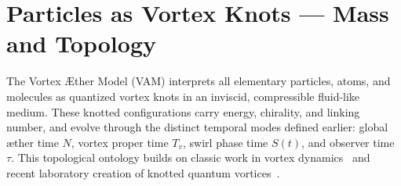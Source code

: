 \documentclass[preprint]{revtex4-2}
\begin{document}
\section{Particles as Vortex Knots — Mass and Topology}
    The Vortex \AE{}ther Model (VAM) interprets all elementary particles, atoms, and molecules as quantized vortex knots in an inviscid, compressible fluid-like medium. These knotted configurations carry energy, chirality, and linking number, and evolve through the distinct temporal modes defined earlier: global æther time \( N \), vortex proper time \( T_v \), swirl phase time \( S(t) \), and observer time \( \tau \). This topological ontology builds on classic work in vortex dynamics~\cite{moffatt1969degree, arnold1998topological, saffman1992vortex} and recent laboratory creation of knotted quantum vortices~\cite{kleckner2013creation}.
\end{document}
